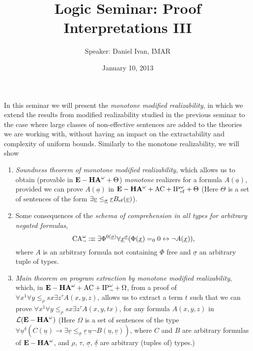 \documentclass[a4paper,12pt]{article}
\title{Logic Seminar: Proof Interpretations III}
\author{Speaker: Daniel Ivan, IMAR}
\date{January 10, 2013}
\begin{document}
\maketitle
In this seminar we will present the \emph{monotone modified realizability}, in which we extend the results from modified realizability studied in the previous seminar to the case where large classes of non-effective sentences are added to the theories we are working with, without having an impact on the extractability and complexity of uniform bounds.
Similarly to the monotone realizability, we will show
\begin{enumerate}
 \item  \emph{Soundness theorem of \emph{monotone} modified realizability}, which allows us to obtain (provable in ${\bf E-HA}^\omega + \Theta$) \emph{monotone} realizers for a formula $A(\underline{a})$, provided we can prove $A(\underline{a})$ in ${\bf E-HA}^\omega +{\rm AC} +{\rm IP}^\omega_{\rm ef} + \Theta$ (Here $\Theta$ is a set of sentences of the form $\exists \underline{v}\leq_{\underline{\sigma}} \underline{r} B_{\rm ef}(\underline{v})$).
 \item Some consequences of the \emph{schema of comprehension in all types for arbitrary negated formulas},
 \begin{equation*}
  {\rm CA}_\lnot^\omega:\equiv \exists \Phi^{0(\underline{\sigma})} \forall \underline{x}^{\underline{\sigma}}(\Phi(\underline{x})=_0 0 \leftrightarrow \lnot A(\underline{x})),
 \end{equation*}
where $A$ is an arbitrary formula not containing $\Phi$ free and $\underline{\sigma}$ an arbitrary tuple of types.
 \item \emph{Main theorem on program extraction by \emph{monotone} modified realizability}, which, in ${\bf E-HA}^\omega+{\rm AC}+{\rm IP}^\omega_{\lnot} + \Omega$, from a proof of $\forall x^1 \forall y\leq_{\rho} sx \exists z^\tau A(x,y,z)$, allows us to extract a term $t$ such that we can prove $\forall x^1 \forall y\leq_\rho sx \exists z^\tau  A(x,y, tx)$, for any formula $A(x,y,z)$ in $\mathcal{L}({\bf E-HA}^\omega)$ (Here $\Omega$ is a set of sentences of the type $\forall \underline{u}^{\underline{\delta}} (C(\underline{u}) \rightarrow \exists \underline{v} \leq_{\underline{\sigma}} \underline{r}\,\underline{u} \lnot B(\underline{u}, \underline{v}))$, where $C$ and $B$ are arbitrary formulas of ${\bf E-HA}^\omega$, and $\rho$, $\tau$, $\underline{\sigma}$, $\underline{\delta}$ are arbitrary (tuples of) types.)
\end{enumerate}
\end{document}
